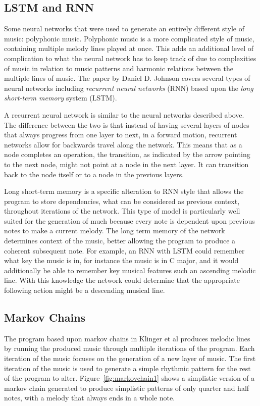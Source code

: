 \documentclass{sig-alternate}
\begin{document}
\subsection{LSTM and RNN}
\label{sec:lstm}
 	Some neural networks that were used to generate an entirely different style of music: polyphonic music. Polyphonic music is a more complicated style of music, containing multiple melody lines played at once. This adds an additional level of complication to what the neural network has to keep track of due to complexities of music in relation to music patterns and harmonic relations between the multiple lines of music. The paper by Daniel D. Johnson covers several types of neural networks including \textit{recurrent neural networks} (RNN) based upon the \textit{long short-term memory} system (LSTM).

	 A recurrent neural network is similar to the neural networks described above. The difference between the two is that instead of having several layers of nodes that always progress from one layer to next, in a forward motion, recurrent networks allow for backwards travel along the network. This means that as a node completes an operation, the transition, as indicated by the arrow pointing to the next node, might not point at a node in the next layer. It can transition back to the node itself or to a node in the previous layers.
	
	Long short-term memory is a specific alteration to RNN style that allows the program to store dependencies, what can be considered as previous context, throughout iterations of the network. This type of model is particularly well suited for the generation of much because every note is dependent upon previous notes to make a current melody. The long term memory of the network determines  context of the music, better allowing the program to produce a coherent subsequent note. For example, an RNN with LSTM could remember what key the music is in, for instance the music is in C major, and it would additionally be able to remember key musical features such an ascending melodic line. With this knowledge the network could determine that the appropriate following action might be a descending musical line.

\subsection{Markov Chains}
\label{sec:markovmethods}
	The program based upon markov chains in Klinger et al produces melodic lines by running the produced music through multiple iterations of the program. Each iteration of the music focuses on the generation of a new layer of music. The first iteration of the music is used to generate a simple rhythmic pattern for the rest of the program to alter. Figure~\ref{fig:markovchain1} shows a simplistic version of a markov chain generated to produce simplistic patterns of only quarter and half notes, with a melody that always ends in a whole note.
\end{document}
